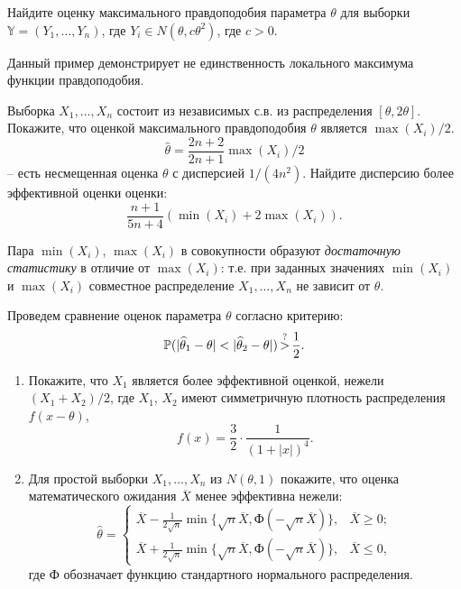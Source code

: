\begin{problem}
Найдите оценку максимального правдоподобия параметра $\theta$ для выборки $\mathbb{Y} = (Y_1, ..., Y_n)$, где $Y_i \in N(\theta, c \theta^2)$, где $c>0$. 
\end{problem}

\begin{remark}
Данный пример демонстрирует не единственность локального максимума функции правдоподобия. 
\end{remark}

\begin{problem}
Выборка $X_1,\ldots, X_n$  состоит из независимых с.в. из распределения  $[\theta, 2\theta]$. Покажите, что оценкой максимального правдоподобия $\theta$ является $\max(X_i) / 2$.  
\[
\widehat{\theta} = \frac{2n+2}{2n+1} \max(X_i) / 2
\] 
-- есть несмещенная оценка $\theta$ с дисперсией $1/(4n^2)$.
Найдите дисперсию более эффективной оценки оценки:
 \[
 \frac{n+1}{5n+4}(\min (X_i) + 2 \max(X_i)).
 \] 
\end{problem}

\begin{remark}
Пара $\min (X_i)$,  $\max(X_i)$ в совокупности образуют \emph{достаточную статистику} в отличие от $\max(X_i)$: т.е. при заданных значениях  $\min (X_i)$ и $\max(X_i)$ совместное распределение $X_1,\ldots, X_n$ не зависит от $\theta$. 
\end{remark}

\begin{problem}
Проведем сравнение оценок параметра $\theta$ согласно критерию:
\[
\mathrm{{\mathbb P}}(| \widehat{\theta}_1 - \theta | < | \widehat{\theta}_2 - \theta |) \mathop{>} \limits^? \frac{1}{2}.
\] 
\begin{enumerate}
\item Покажите, что  $X_1$ является более эффективной оценкой, нежели  $(X_1 + X_2)/2$, где $X_1$, $X_2$ имеют симметричную плотность распределения $f(x-\theta)$, 
\[
f(x) = \frac{3}{2} \cdot \frac{1}{(1+|x|)^4}.
\] 
\item Для простой выборки $X_1,\ldots, X_n$ из $N(\theta, 1)$ покажите, что оценка математического ожидания $\overline{X}$ менее эффективна нежели:
\[
\widehat{\theta} = 
\begin{cases}
\overline{X} - \frac{1}{2\sqrt{n}} \min\{\sqrt{n}\overline{X}, \text{Ф}(-\sqrt{n}\overline{X})\},  & \overline{X} \geq 0;\\
\overline{X} + \frac{1}{2\sqrt{n}} \min\{\sqrt{n}\overline{X}, \text{Ф}(-\sqrt{n}\overline{X})\}, & \overline{X} \leq 0,
\end{cases}
\] 
где $\text{Ф}$ обозначает функцию стандартного нормального распределения.
\end{enumerate}
\end{problem}


